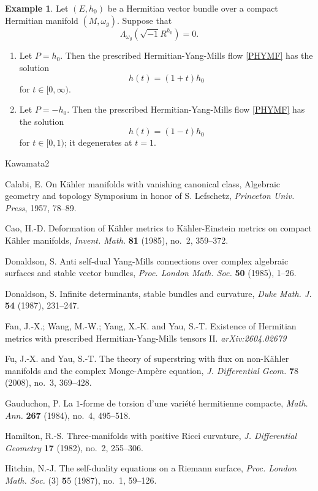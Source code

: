 \documentclass[12pt, reqno]{amsart}
\theoremstyle{plain}
\theoremstyle{definition}
\newtheorem{example}[thm]{Example}
\newcommand{\eexample}{\end{example}}
\newcommand{\bexample}{\begin{example}}
\newcommand{\sq}{\sqrt{-1}}
\newcommand{\bd}{\begin{enumerate}}
\newcommand{\ed}{\end{enumerate}}
\renewcommand{\>}{\rightarrow}
\renewcommand{\>}{\rightarrow}
\numberwithin{equation}{section} %
\begin{document}
\bexample Let $(E,h_0)$ be a Hermitian vector bundle over a compact Hermitian manifold $(M,\omega_g)$. Suppose that
$$\Lambda_{\omega_g}\left(\sq R^{h_0}\right)=0.$$
\bd \item Let $P=h_0$. Then the prescribed Hermitian-Yang-Mills flow \eqref{PHYMF}
has  the solution
$$h(t)=(1+t)h_0$$
for $t\in[0,\infty)$.
\item  Let $P=-h_0$.  Then the prescribed Hermitian-Yang-Mills flow \eqref{PHYMF} has  the solution
$$h(t)=(1-t)h_0$$
for $t\in[0,1)$; it degenerates at $t=1$.
\ed \eexample
        \begin{thebibliography}{Kawamata2}


    Calabi, E.  On K\"ahler manifolds with vanishing canonical class,  Algebraic geometry and topology Symposium in honor of S. Lefschetz, \emph{Princeton Univ. Press}, 1957, 78--89.

    Cao, H.-D. Deformation of K\"ahler metrics to K\"ahler-Einstein metrics on compact K\"ahler manifolds, \emph{Invent. Math.} {\bf 81} (1985), no.~2, 359--372.


    Donaldson, S. Anti self-dual Yang-Mills connections over complex algebraic surfaces and stable vector bundles,
    \emph{Proc. London Math. Soc.} \textbf{50} (1985), 1--26.

    Donaldson, S.  Infinite determinants, stable bundles and curvature,
    \emph{Duke Math. J.} \textbf{54} (1987), 231--247.




     Fan, J.-X.; Wang, M.-W.; Yang, X.-K. and Yau, S.-T. Existence of Hermitian metrics  with  prescribed Hermitian-Yang-Mills tensors   II.  \emph{arXiv:2604.02679}

      Fu, J.-X.  and Yau, S.-T. The theory of superstring with flux on non-K\"ahler manifolds and the complex Monge-Amp\`ere equation, \emph{J. Differential Geom.} {\textbf 78} (2008), no.~3, 369--428.

Gauduchon, P. La $1$-forme de torsion d'une vari\'et\'e{} hermitienne compacte, \emph{Math. Ann. }{\bf 267} (1984), no.~4, 495--518.



 Hamilton,  R.-S. Three-manifolds with positive Ricci curvature, \emph{J. Differential Geometry} {\bf 17} (1982), no.~2, 255--306.


    Hitchin, N.-J. The self-duality equations on a Riemann surface, \emph{Proc. London Math. Soc.} (3) {\textbf 55} (1987), no.~1, 59--126.



\end{thebibliography}
\end{document}
